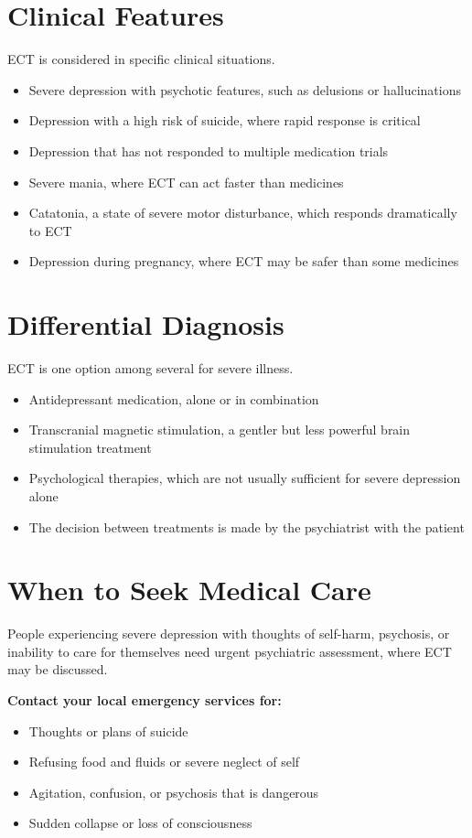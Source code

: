 \section*{Clinical Features}
ECT is considered in specific clinical situations.
\begin{itemize}
    \item Severe depression with psychotic features, such as delusions or hallucinations
    \item Depression with a high risk of suicide, where rapid response is critical
    \item Depression that has not responded to multiple medication trials
    \item Severe mania, where ECT can act faster than medicines
    \item Catatonia, a state of severe motor disturbance, which responds dramatically to ECT
    \item Depression during pregnancy, where ECT may be safer than some medicines
\end{itemize}

\section*{Differential Diagnosis}
ECT is one option among several for severe illness.
\begin{itemize}
    \item Antidepressant medication, alone or in combination
    \item Transcranial magnetic stimulation, a gentler but less powerful brain stimulation treatment
    \item Psychological therapies, which are not usually sufficient for severe depression alone
    \item The decision between treatments is made by the psychiatrist with the patient
\end{itemize}

\section*{When to Seek Medical Care}
People experiencing severe depression with thoughts of self-harm, psychosis, or inability to care for themselves need urgent psychiatric assessment, where ECT may be discussed.

\textbf{Contact your local emergency services for:}
\begin{itemize}
    \item Thoughts or plans of suicide
    \item Refusing food and fluids or severe neglect of self
    \item Agitation, confusion, or psychosis that is dangerous
    \item Sudden collapse or loss of consciousness
\end{itemize}

